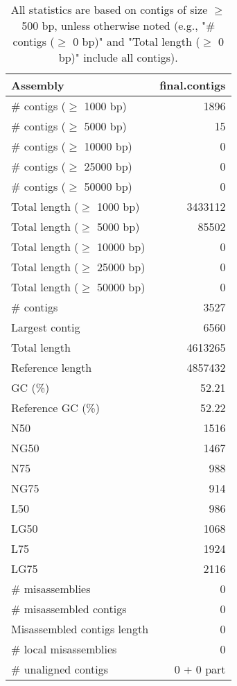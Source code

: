 \documentclass[12pt,a4paper]{article}
\begin{document}
\begin{table}[ht]
\begin{center}
\caption{All statistics are based on contigs of size $\geq$ 500 bp, unless otherwise noted (e.g., "\# contigs ($\geq$ 0 bp)" and "Total length ($\geq$ 0 bp)" include all contigs).}
\begin{tabular}{|l*{1}{|r}|}
\hline
Assembly & final.contigs \\ \hline
\# contigs ($\geq$ 1000 bp) & 1896 \\ \hline
\# contigs ($\geq$ 5000 bp) & 15 \\ \hline
\# contigs ($\geq$ 10000 bp) & 0 \\ \hline
\# contigs ($\geq$ 25000 bp) & 0 \\ \hline
\# contigs ($\geq$ 50000 bp) & 0 \\ \hline
Total length ($\geq$ 1000 bp) & 3433112 \\ \hline
Total length ($\geq$ 5000 bp) & 85502 \\ \hline
Total length ($\geq$ 10000 bp) & 0 \\ \hline
Total length ($\geq$ 25000 bp) & 0 \\ \hline
Total length ($\geq$ 50000 bp) & 0 \\ \hline
\# contigs & 3527 \\ \hline
Largest contig & 6560 \\ \hline
Total length & 4613265 \\ \hline
Reference length & 4857432 \\ \hline
GC (\%) & 52.21 \\ \hline
Reference GC (\%) & 52.22 \\ \hline
N50 & 1516 \\ \hline
NG50 & 1467 \\ \hline
N75 & 988 \\ \hline
NG75 & 914 \\ \hline
L50 & 986 \\ \hline
LG50 & 1068 \\ \hline
L75 & 1924 \\ \hline
LG75 & 2116 \\ \hline
\# misassemblies & 0 \\ \hline
\# misassembled contigs & 0 \\ \hline
Misassembled contigs length & 0 \\ \hline
\# local misassemblies & 0 \\ \hline
\# unaligned contigs & 0 + 0 part \\ \hline

\end{tabular}
\end{center}
\end{table}
\end{document}
